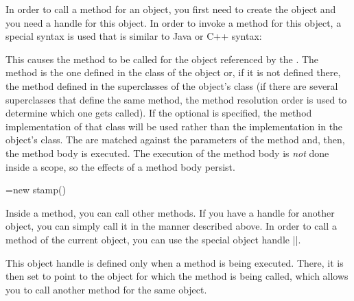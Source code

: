 In order to call a method for an object, you first need to create the object
and you need a handle for this object. In order to invoke a method for this
object, a special syntax is used that is similar to Java or C++ syntax:

\begin{pgfmanualentry}
    \pgfmanualbody
    This causes the method  to be called for the object
    referenced by the . The method is the one defined in
    the class of the object or, if it is not defined there, the method defined
    in the superclasses of the object's class (if there are several
    superclasses that define the same method, the method resolution order is
    used to determine which one gets called). If the optional  is specified, the method implementation of that class will be used
    rather than the implementation in the object's class. The 
    are matched against the parameters of the method and, then, the method body
    is executed. The execution of the method body is \emph{not} done inside a
    scope, so the effects of a method body persist.
\begin{codeexample}

\pgfoonew \mystamp=new stamp()

\end{codeexample}

    Inside a method, you can call other methods. If you have a handle for
    another object, you can simply call it in the manner described above. In
    order to call a method of the current object, you can use the special
    object handle |\pgfoothis|.

    \begin{command}{\pgfoothis}
        This object handle is defined only when a method is being executed.
        There, it is then set to point to the object for which the method is
        being called, which allows you to call another method for the same
        object.
\begin{codeexample}
\end{codeexample}
\end{command}
\end{pgfmanualentry}
